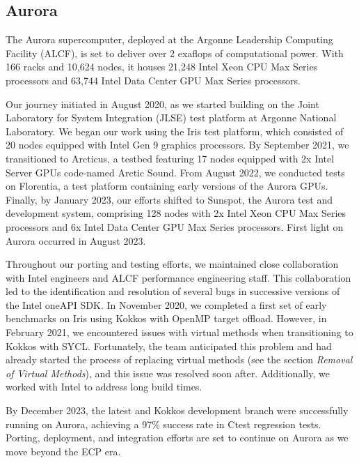 
\subsection{Aurora}


The Aurora supercomputer, deployed at the Argonne Leadership Computing Facility (ALCF), is set to deliver over 2 exaflops of computational power. With 166 racks and 10,624 nodes, it houses 21,248 Intel Xeon CPU Max Series processors and 63,744 Intel Data Center GPU Max Series processors.

Our journey initiated in August 2020, as we started building \vtkm on the Joint Laboratory for System Integration (JLSE) test platform at Argonne National Laboratory. We began our work using the Iris test platform, which consisted of 20 nodes equipped with Intel Gen 9 graphics processors. By September 2021, we transitioned to Arcticus, a testbed featuring 17 nodes equipped with 2x Intel Server GPUs code-named Arctic Sound. From August 2022, we conducted tests on Florentia, a test platform containing early versions of the Aurora GPUs. Finally, by January 2023, our efforts shifted to Sunspot, the Aurora test and development system, comprising 128 nodes with 2x Intel Xeon CPU Max Series processors and 6x Intel Data Center GPU Max Series processors. First light on Aurora occurred in August 2023.

Throughout our porting and testing efforts, we maintained close collaboration with Intel engineers and ALCF performance engineering staff. This collaboration led to the identification and resolution of several bugs in successive versions of the Intel oneAPI SDK. In November 2020, we completed a first set of early \vtkm benchmarks on Iris using Kokkos with OpenMP target offload. However, in February 2021, we encountered issues with virtual methods when transitioning to Kokkos with SYCL. Fortunately, the team anticipated this problem and had already started the process of replacing virtual methods (see the section {\it Removal of Virtual Methods}), and this issue was resolved soon after. Additionally, we worked with Intel to address long build times.

By December 2023, the latest \vtkm and Kokkos development branch were successfully running on Aurora, achieving a 97\% success rate in Ctest regression tests. Porting, deployment, and integration efforts are set to continue on Aurora as we move beyond the ECP era.
